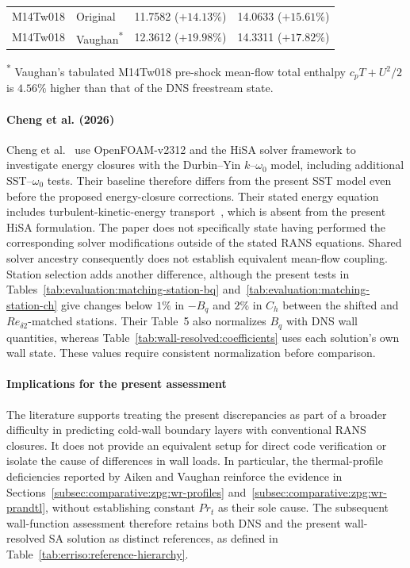 \begin{table}[H]
\begin{tabular}{@{}llrr@{}}
        M14Tw018 & Original & 11.7582 (\(+14.13\%\)) & 14.0633 (\(+15.61\%\)) \\
        M14Tw018 & Vaughan\textsuperscript{*} & 12.3612 (\(+19.98\%\)) & 14.3311 (\(+17.82\%\)) \\
        \bottomrule
    \end{tabular}
    \par\smallskip
    \begin{minipage}{\linewidth}
        \footnotesize
        \textsuperscript{*} Vaughan's tabulated M14Tw018 pre-shock mean-flow total enthalpy \(c_pT+U^2/2\) is \(4.56\%\) higher than that of the DNS freestream state.
    \end{minipage}
\end{table}

\paragraph*{Cheng et al. (2026)}

Cheng et al.~\cite{cheng2026reynolds} use OpenFOAM-v2312 and the HiSA solver framework to investigate energy closures with the Durbin--Yin \(k\)--\(\omega_0\) model, including additional SST--\(\omega_0\) tests. Their baseline therefore differs from the present SST model even before the proposed energy-closure corrections. Their stated energy equation includes turbulent-kinetic-energy transport~\cite[Eq.~2.7]{cheng2026reynolds}, which is absent from the present HiSA formulation. The paper does not specifically state having performed the corresponding solver modifications outside of the stated RANS equations. Shared solver ancestry consequently does not establish equivalent mean-flow coupling. Station selection adds another difference, although the present tests in Tables~\ref{tab:evaluation:matching-station-bq} and~\ref{tab:evaluation:matching-station-ch} give changes below \(1\%\) in \(-B_q\) and \(2\%\) in \(C_h\) between the shifted and \(Re_{\delta2}\)-matched stations. Their Table~5 also normalizes \(B_q\) with DNS wall quantities, whereas Table~\ref{tab:wall-resolved:coefficients} uses each solution's own wall state. These values require consistent normalization before comparison.

\paragraph*{Implications for the present assessment}

The literature supports treating the present discrepancies as part of a broader difficulty in predicting cold-wall boundary layers with conventional RANS closures. It does not provide an equivalent setup for direct code verification or isolate the cause of differences in wall loads. In particular, the thermal-profile deficiencies reported by Aiken and Vaughan reinforce the evidence in Sections~\ref{subsec:comparative:zpg:wr-profiles} and~\ref{subsec:comparative:zpg:wr-prandtl}, without establishing constant \(Pr_t\) as their sole cause. The subsequent wall-function assessment therefore retains both DNS and the present wall-resolved SA solution as distinct references, as defined in Table~\ref{tab:erriso:reference-hierarchy}.

